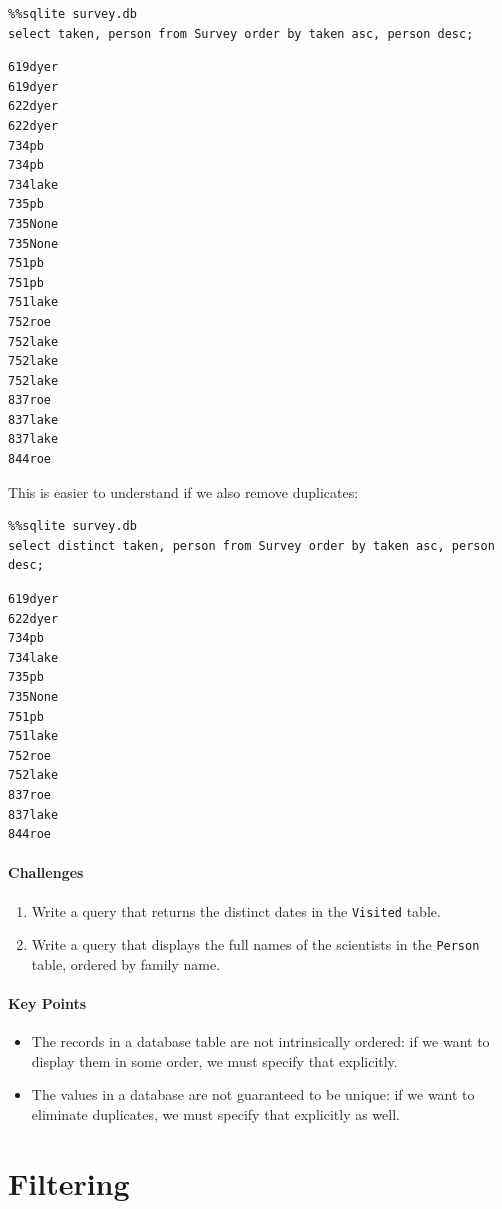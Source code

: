 \documentclass[]{book}
\begin{document}
\begin{verbatim}
%%sqlite survey.db
select taken, person from Survey order by taken asc, person desc;
\end{verbatim}

\begin{verbatim}
619dyer
619dyer
622dyer
622dyer
734pb
734pb
734lake
735pb
735None
735None
751pb
751pb
751lake
752roe
752lake
752lake
752lake
837roe
837lake
837lake
844roe
\end{verbatim}

This is easier to understand if we also remove duplicates:

\begin{verbatim}
%%sqlite survey.db
select distinct taken, person from Survey order by taken asc, person desc;
\end{verbatim}

\begin{verbatim}
619dyer
622dyer
734pb
734lake
735pb
735None
751pb
751lake
752roe
752lake
837roe
837lake
844roe
\end{verbatim}

\mbox{}\paragraph{Challenges}

\begin{enumerate}
\item
  Write a query that returns the distinct dates in the \texttt{Visited}
  table.
\item
  Write a query that displays the full names of the scientists in the
  \texttt{Person} table, ordered by family name.
\end{enumerate}

\mbox{}\paragraph{Key Points}

\begin{itemize}
\item
  The records in a database table are not intrinsically ordered: if we
  want to display them in some order, we must specify that explicitly.
\item
  The values in a database are not guaranteed to be unique: if we want
  to eliminate duplicates, we must specify that explicitly as well.
\end{itemize}

\section{Filtering}
\end{document}
